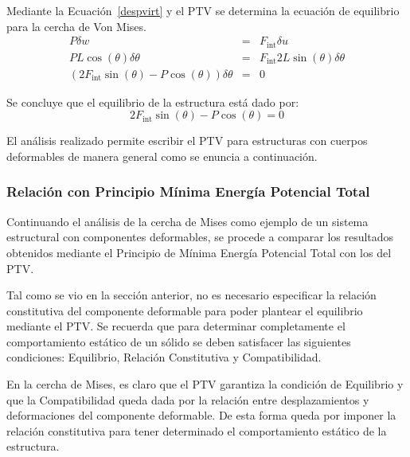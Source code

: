 Mediante la Ecuación~\eqref{despvirt} y el PTV se determina la ecuación de equilibrio para la cercha de Von Mises.
%
\begin{eqnarray}
P \delta w &=& F_{\text{int}} \delta u \nonumber\\
PL\cos(\theta)\delta \theta &=& F_{\text{int}}2L\sin(\theta)\delta \theta \nonumber \\
\left(2F_{\text{int}}\sin(\theta)-P\cos(\theta)\right)\delta \theta &=& 0 \label{eqn:eqlabel}	
\end{eqnarray}

Se concluye que el equilibrio de la estructura está dado por: 
%
\begin{equation}
2F_{\text{int}}\sin(\theta)-P\cos(\theta)=0
\end{equation}

El análisis realizado permite escribir el PTV para estructuras con cuerpos deformables de manera general como se enuncia a continuación.



\subsubsection{Relación con Principio Mínima Energía Potencial Total}

Continuando el análisis de la cercha de Mises como ejemplo de un sistema estructural con componentes deformables, se procede a comparar los resultados obtenidos mediante el Principio de Mínima Energía Potencial Total con los del PTV.

Tal como se vio en la sección anterior, no es necesario especificar la relación constitutiva del componente deformable para poder plantear el equilibrio mediante el PTV. %
%
Se recuerda que para determinar completamente el comportamiento estático de un sólido se deben satisfacer las siguientes condiciones: Equilibrio, Relación Constitutiva y Compatibilidad.

En la cercha de Mises, es claro que el PTV garantiza la condición de Equilibrio y que la Compatibilidad queda dada por la relación entre desplazamientos y deformaciones del componente deformable. De esta forma queda por imponer la relación constitutiva para tener determinado el comportamiento estático de la estructura.

